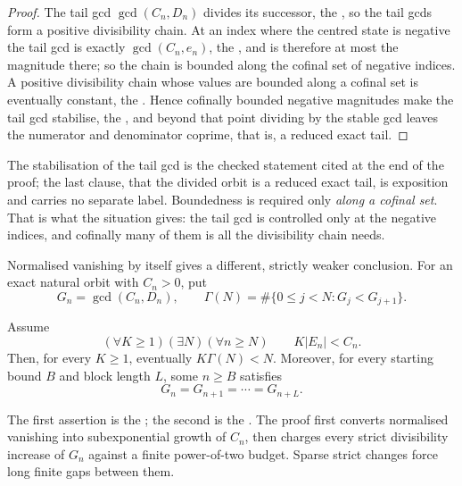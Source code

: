 \documentclass[11pt]{article}
\begin{document}
\begin{proof}
The tail gcd $\gcd(C_n,D_n)$ divides its successor, the
, so the tail gcds form a positive divisibility chain.  At an
index where the centred state is negative the tail gcd is exactly
$\gcd(C_n,e_n)$, the
, and is therefore at most the magnitude there; so the
chain is bounded along the cofinal set of negative indices.  A positive
divisibility chain whose values are bounded along a cofinal set is eventually
constant, the
.  Hence cofinally bounded negative magnitudes make the tail gcd
stabilise, the
, and beyond that point dividing by the stable gcd leaves the
numerator and denominator coprime, that is, a reduced exact tail.
\end{proof}

\noindent The stabilisation of the tail gcd is the checked statement cited at
the end of the proof; the last clause, that the divided orbit is a reduced
exact tail, is exposition and carries no separate label.  Boundedness is
required only \emph{along a cofinal set}.  That is what the situation gives:
the tail gcd is
controlled only at the negative indices, and cofinally many of them is all the
divisibility chain needs.

Normalised vanishing by itself gives a different, strictly weaker conclusion.
For an exact natural orbit with $C_n>0$, put
\[
 G_n=\gcd(C_n,D_n),\qquad
 \Gamma(N)=\#\{0\le j<N:G_j<G_{j+1}\}.
\]

\begin{proposition}
\label{res:gcdsparse}
Assume
\[
  (\forall K\ge1)(\exists N)(\forall n\ge N)\qquad
  K|E_n|<C_n.
\]
Then, for every $K\ge1$, eventually $K\Gamma(N)<N$.  Moreover, for every
starting bound $B$ and block length $L$, some $n\ge B$ satisfies
\[
  G_n=G_{n+1}=\cdots=G_{n+L}.
\]
\end{proposition}

\noindent The first assertion is the
; the second is the
.  The proof first converts normalised vanishing
into subexponential growth of $C_n$, then charges every strict divisibility
increase of $G_n$ against a finite power-of-two budget.  Sparse strict changes
force long finite gaps between them.
\end{document}
